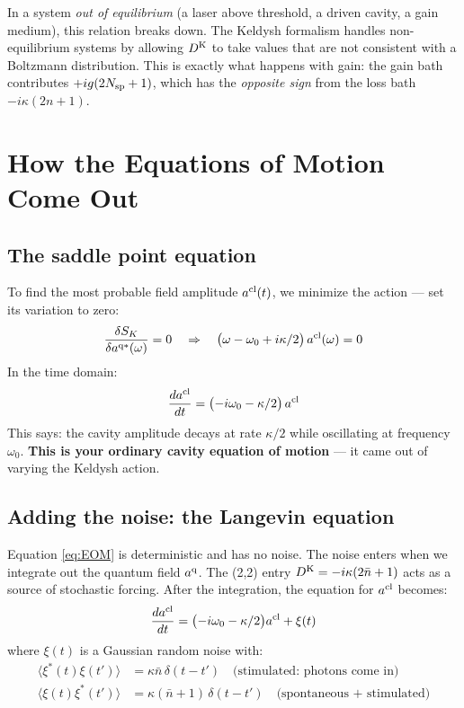 \documentclass[12pt]{article}
\newcommand{\cl}{{\rm cl}}
\newcommand{\q}{{\rm q}}
\newcommand{\Keldysh}{{\rm K}}
\newcommand{\av}[1]{\langle #1 \rangle}
\providecommand{\cl}{{\rm cl}}
\providecommand{\q}{{\rm q}}
\providecommand{\Keldysh}{{\rm K}}
\begin{document}
In a system \emph{out of equilibrium} (a laser above threshold,
a driven cavity, a gain medium), this relation breaks down. The
Keldysh formalism handles non-equilibrium systems by allowing
$D^\Keldysh$ to take values that are not consistent with a
Boltzmann distribution. This is exactly what happens with gain:
the gain bath contributes $+ig(2N_{\rm sp}+1)$, which has the
\emph{opposite sign} from the loss bath $-i\kappa(2n+1)$.

\section{How the Equations of Motion Come Out}

\subsection{The saddle point equation}

To find the most probable field amplitude $a^\cl(t)$, we minimize the
action --- set its variation to zero:
\begin{equation}
  \frac{\delta S_K}{\delta a^{\q*}(\omega)} = 0
  \quad\Rightarrow\quad
  \bigl(\omega - \omega_0 + i\kappa/2\bigr)\,a^\cl(\omega) = 0
\end{equation}
In the time domain:
\begin{equation}
  \frac{da^\cl}{dt} = \bigl(-i\omega_0 - \kappa/2\bigr)\,a^\cl
  \label{eq:EOM}
\end{equation}
This says: the cavity amplitude decays at rate $\kappa/2$ while
oscillating at frequency $\omega_0$. \textbf{This is your ordinary
cavity equation of motion} --- it came out of varying the Keldysh action.

\subsection{Adding the noise: the Langevin equation}

Equation \eqref{eq:EOM} is deterministic and has no noise.
The noise enters when we integrate out the quantum field $a^\q$.
The (2,2) entry $D^\Keldysh = -i\kappa(2\bar{n}+1)$ acts as a source
of stochastic forcing. After the integration, the equation for
$a^\cl$ becomes:
\begin{equation}
  \frac{da^\cl}{dt} =
  \bigl(-i\omega_0 - \kappa/2\bigr)a^\cl + \xi(t)
  \label{eq:Langevin}
\end{equation}
where $\xi(t)$ is a Gaussian random noise with:
\begin{align}
  \av{\xi^*(t)\xi(t')} &= \kappa\bar{n}\,\delta(t-t')
  \quad\text{(stimulated: photons come in)}\\
  \av{\xi(t)\xi^*(t')} &= \kappa(\bar{n}+1)\,\delta(t-t')
  \quad\text{(spontaneous + stimulated)}
\end{align}
\end{document}
